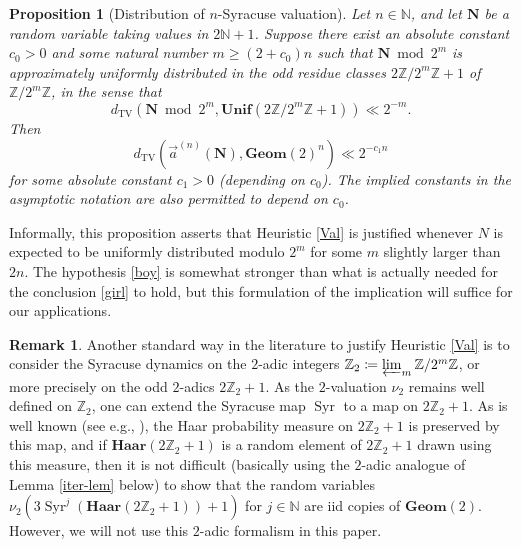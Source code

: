 \documentclass[12pt,a4paper,reqno]{amsart}
\numberwithin{equation}{section}
\theoremstyle{plain}
\newtheorem{proposition}[theorem]{Proposition}
\theoremstyle{definition}
\newtheorem{remark}[theorem]{Remark}
\newcommand\Z{\mathbb{Z}}
\newcommand\N{\mathbb{N}}
\newcommand\Unif{\mathbf{Unif}}
\newcommand\Geom{\mathbf{Geom}}
\newcommand\TV{{\operatorname{TV}}}
\newcommand\Syr{{\operatorname{Syr}}}
\renewcommand{\mod}{\bmod}
\begin{document}
\begin{proposition}[Distribution of $n$-Syracuse valuation]\label{rach}  Let $n \in \N$, and let $\mathbf{N}$ be a random variable taking values in $2\N+1$.  Suppose there exist an absolute constant $c_0 > 0$ and some natural number $m \geq (2+c_0) n$ such that $\mathbf{N} \mod 2^{m}$ is approximately uniformly distributed in the odd residue classes $2\Z/2^m\Z+1$ of $\Z/2^m\Z$, in the sense that
\begin{equation}\label{boy}
 d_\TV( \mathbf{N} \mod 2^{m}, \Unif(2\Z/2^{m}\Z+1) ) \ll 2^{-m}.
\end{equation}
Then
\begin{equation}\label{girl}
 d_\TV( \vec a^{(n)}(\mathbf{N}), \Geom(2)^n ) \ll 2^{-c_1 n}
\end{equation}
for some absolute constant $c_1>0$ (depending on $c_0$).  The implied constants in the asymptotic notation are also permitted to depend on $c_0$.
\end{proposition}

Informally, this proposition asserts that Heuristic \ref{Val} is justified whenever $N$ is expected to be uniformly distributed modulo $2^m$ for some $m$ slightly larger than $2n$.  The hypothesis \eqref{boy} is somewhat stronger than what is actually needed for the conclusion \eqref{girl} to hold, but this formulation of the implication will suffice for our applications.

\begin{remark}\label{cat}  Another standard way in the literature to justify Heuristic \ref{Val} is to consider the Syracuse dynamics on the $2$-adic integers $\Z_2 \coloneqq \varprojlim_m \Z/2^m\Z$, or more precisely on the odd $2$-adics $2\Z_2+1$.  As the $2$-valuation $\nu_2$ remains well defined on $\Z_2$, one can extend the Syracuse map $\Syr$ to a map on $2\Z_2+1$.  As is well known (see e.g., \cite{lag}), the Haar probability measure on $2\Z_2+1$ is preserved by this map, and if $\mathbf{Haar}(2\Z_2+1)$ is a random element of $2\Z_2+1$ drawn using this measure, then it is not difficult (basically using the $2$-adic analogue of Lemma \ref{iter-lem} below) to show that the random variables $\nu_2( 3\Syr^{j}(\mathbf{Haar}(2\Z_2+1)) + 1)$ for $j \in \N$ are iid copies of $\Geom(2)$. However, we will not use this $2$-adic formalism in this paper.
\end{remark}
\end{document}
